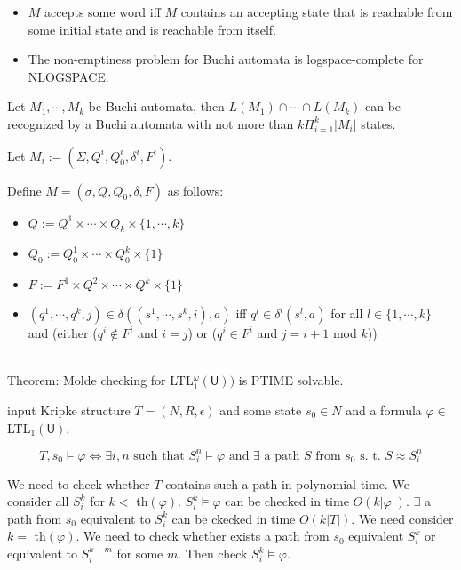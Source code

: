 \documentclass[12pt]{article}
\begin{document}
\begin{CJK*}{GBK}{song}
\begin{itemize}
\item $M$ accepts some word iff $M$ contains an accepting state that is reachable from some initial state and is reachable from itself. 

\item The non-emptiness problem for Buchi automata is logspace-complete for NLOGSPACE.

\end{itemize}

Let $M_1,\cdots, M_k$ be Buchi automata, then $L(M_1)\cap\cdots\cap L(M_k)$ can be recognized by a Buchi automata with not more than $k\Pi^k_{i=1}|M_i|$ states. 

Let 
$M_i:=(\Sigma, Q^i, Q^i_0,\delta^i, F^i)$. 

Define $M=(\sigma, Q, Q_0, \delta, F)$ as follows:

\begin{itemize}
\item $Q:=Q^1\times\cdots\times Q_k\times\{1,\cdots,k\}$
\item $Q_0:=Q_0^1\times\cdots\times Q_0^k\times\{1\}$
\item $F:=F^1\times Q^2\times\cdots\times Q^k\times\{1\}$
\item $(q^1,\cdots, q^k, j)\in \delta ((s^1,\cdots, s^k,i),a)$ iff $q^l\in \delta^l(s^l,a)$ for all $l\in\{1,\cdots,k\}$ and 
(either ($q^i\not\in F^i$ and $i=j$) or ($q^i\in F^i$ and $j=i+1$ mod $k$))
\end{itemize}


 

\ \\
Theorem: Molde checking for LTL$^\omega_1(\textsf{U}))$ is PTIME solvable.

input Kripke structure $T=(N,R,\epsilon)$ and some state $s_0\in N$ and a formula $\varphi\in $ LTL$_1(\textsf{U})$.

$$T,s_0\models \varphi  \Longleftrightarrow \exists i,n \mbox{ such that }S_i^n\models \varphi \mbox{ and }\exists \mbox{ a path $S$ from $s_0$ s. t. }S\approx S^n_i$$

We need to check whether $T$ contains such a path in polynomial time. We consider all $S^k_i$ for $k<$ th$(\varphi)$. $S^k_i\models \varphi$ can be checked in time $O(k|\varphi|)$. $\exists $ a path from $s_0$ equivalent to $S^k_i$ can be ckecked in time $O(k|T|)$. We need consider $k=$ th$(\varphi)$. We need to check whether exists a path from $s_0$ equivalent $S^k_i$ or equivalent to $S^{k+m}_i$ for some $m$. Then check $S^k_i\models\varphi$.\\



\end{CJK*}
\end{document}
